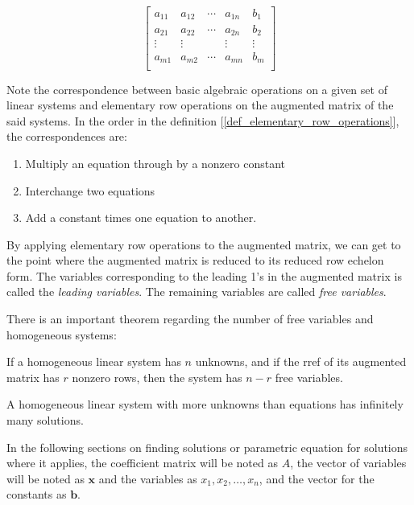 \documentclass{report}
\begin{document}
		\begin{displaymath}
			\left[\begin{array}{cccc|c}
				a_{11} & a_{12} & \cdots & a_{1n} & b_1\\
				a_{21} & a_{22} & \cdots & a_{2n} & b_2\\
				\vdots & \vdots &        & \vdots & \vdots\\
				a_{m1} & a_{m2} & \cdots & a_{mn} & b_m\\
			\end{array}\right]
		\end{displaymath}
		
		Note the correspondence between basic algebraic operations on a given set of linear systems and elementary row operations on the augmented matrix of the said systems. In the order in the definition [\ref{def_elementary_row_operations}], the correspondences are:
		
		\begin{enumerate}
			\item Multiply an equation through by a nonzero constant
			\item Interchange two equations	
			\item Add a constant times one equation to another.
		\end{enumerate}
		
		By applying elementary row operations to the augmented matrix, we can get to the point where the augmented matrix is reduced to its reduced row echelon form. The variables corresponding to the leading 1's in the augmented matrix is called the \emph{leading variables}. The remaining variables are called \emph{free variables}.
		
		There is an important theorem regarding the number of free variables and homogeneous systems:
		
		\begin{thm}
			If a homogeneous linear system has $n$ unknowns, and if the rref of its augmented matrix has $r$ nonzero rows, then the system has $n-r$ free variables.
		\end{thm}
		
		\begin{coro}
			A homogeneous linear system with more unknowns than equations has infinitely many solutions.
		\end{coro}
		
		In the following sections on finding solutions or parametric equation for solutions where it applies, the coefficient matrix will be noted as $A$, the vector of variables will be noted as $\bm{x}$ and the variables as $x_1, x_2, \dots, x_n$, and the vector for the constants as $\bm{b}$.
		
\end{document}
